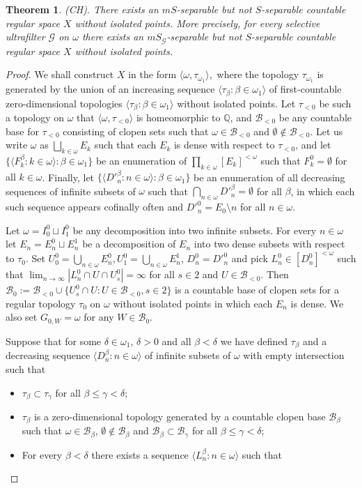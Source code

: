 \documentclass[12pt,a4paper]{amsart}
\newtheorem{theorem}{Theorem}[section]
\theoremstyle{definition}
\newcommand{\w}{\omega}
\newcommand{\B}{\mathcal{B}}
\newcommand{\CG}{\mathcal{G}}
\newcommand{\la}{\langle}
\newcommand{\ra}{\rangle}
\begin{document}
\begin{theorem} \label{mS_vs_S}
(CH). There exists an $mS$-separable but not $S$-separable countable regular space $X$ without isolated points. More precisely, for every
selective ultrafilter $\CG$ on $\w$ 
there exists an $mS_{\CG}$-separable but not $S$-separable countable regular space $X$ without isolated points.
\end{theorem}
\begin{proof}
We shall construct $X$ in the form $\la\w,\tau_{\w_1}\ra,$
where the topology $\tau_{\w_1}$ is generated by the union of an increasing sequence $\la\tau_\beta:\beta\in\w_1\ra$
of first-countable  zero-dimensional topologies $\la\tau_\beta:\beta\in\w_1\ra$ without isolated points. {Let $\tau_{<0}$ be such a topology on $\w$ that 
$\la\w,\tau_{<0}\ra$ is homeomorphic to $\mathbb Q$, and $\B_{<0}$ be any countable base for $\tau_{<0}$ consisting of clopen sets such that $\w\in\B_{<0}$ and $\emptyset\not\in\B_{<0}$.
Let us write $\w$ as $\bigsqcup_{k\in\w}E_k$ such that each $E_k$
is dense with respect to $\tau_{<0}$, and let 
$\{\la F^\beta_k:k\in\w\ra:\beta\in\w_1\}$
be an  enumeration of $\prod_{k\in\w}[E_k]^{<\w}$ 
such that $F^0_k=\emptyset$ for all $k\in\w$}.
Finally, let $\{\la D'^\beta_n:n\in\w\ra:\beta\in\w_1\}$
be an enumeration of all decreasing sequences of {infinite} subsets of $\w$
such that $\bigcap_{n\in\w}D'^\beta_n =\emptyset$ for all $\beta$, in which each such sequence appears cofinally often
{and $D'^0_n=E_0\setminus n$ for all $n\in\w$}.

{Let $\w=I^0_0\sqcup I^0_1$ be any decomposition into two infinite subsets. For every $n\in\w$ let $E_n=E^0_n\sqcup E^1_n$ be a decomposition of $E_n$ into two dense subsets with respect to $\tau_0$.
Set $U^0_0=\bigcup_{n\in\w}E^0_n, U^0_1= \bigcup_{n\in\w}E^1_n$, $D^0_n=D'^0_n$ and pick $L^0_n\in [D^0_n]^{<\w}$ such that 
$\lim_{n\to\infty}|L^0_n\cap U\cap U^0_s|=\infty$ for all $s\in 2$ and $U\in\mathcal B_{<0}$. Then $\mathcal B_0:= \mathcal{B}_{< 0} \cup \{U^0_s\cap U:U\in\mathcal B_{<0} , s \in 2\}$ is a countable base of clopen sets for a regular topology $\tau_0$ on $\w$ without isolated points in which each $E_n$ is dense. We also set
$G_{0,W}=\w$ for any $W\in\B_0$.}


Suppose that for some $\delta\in\w_1$, $\delta>0$ and all $\beta<\delta$ we have defined
$\tau_\beta$  and a decreasing sequence $\la D^\beta_n:n\in\w\ra$
of {infinite} subsets of $\w$ with empty intersection such that 
\begin{itemize}
\item[$(1)$] $\tau_\beta\subset\tau_\gamma$ for all $\beta\leq\gamma<\delta$;
\item[$(2)$] $\tau_\beta$ is a zero-dimensional topology
generated by a countable clopen base $\B_\beta$ such that $\w\in\B_\beta$, 
 $\emptyset\not\in\B_\beta$ {and $\B_\beta\subset\B_\gamma$ for all
 $\beta\leq\gamma<\delta$};
\item[$(3)$] For every $\beta<\delta$ there exists a sequence $\la L^\beta_n:n\in\w\ra$ such that 
\smallskip


\end{itemize}
\end{proof}
\end{document}
